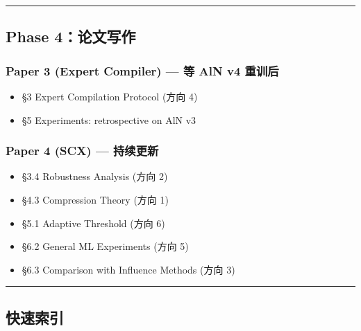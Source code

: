 \documentclass[
  12pt,
]{ctexart}
\providecommand{\tightlist}{%
  \setlength{\itemsep}{0pt}\setlength{\parskip}{0pt}}
\begin{document}
\begin{center}\rule{0.5\linewidth}{0.5pt}\end{center}

\subsection{Phase 4：论文写作}\label{phase-4ux8bbaux6587ux5199ux4f5c}

\subsubsection{Paper 3 (Expert Compiler) --- 等 AlN v4
重训后}\label{paper-3-expert-compiler-ux7b49-aln-v4-ux91cdux8badux540e}

\begin{itemize}
\tightlist
\item[$\square$]
  §3 Expert Compilation Protocol (方向 4)
\item[$\square$]
  §5 Experiments: retrospective on AlN v3
\end{itemize}

\subsubsection{Paper 4 (SCX) ---
持续更新}\label{paper-4-scx-ux6301ux7eedux66f4ux65b0}

\begin{itemize}
\tightlist
\item[$\square$]
  §3.4 Robustness Analysis (方向 2)
\item[$\square$]
  §4.3 Compression Theory (方向 1)
\item[$\square$]
  §5.1 Adaptive Threshold (方向 6)
\item[$\square$]
  §6.2 General ML Experiments (方向 5)
\item[$\square$]
  §6.3 Comparison with Influence Methods (方向 3)
\end{itemize}

\begin{center}\rule{0.5\linewidth}{0.5pt}\end{center}

\subsection{快速索引}\label{ux5febux901fux7d22ux5f15}
\end{document}
